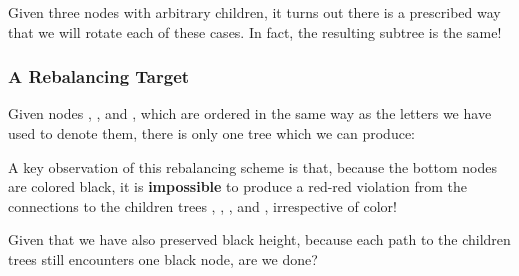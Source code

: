 \documentclass[aspectratio=169, handout]{beamer}
\begin{document}
\begin{frame}
  \pause
  \vspace{\fill}

  Given three nodes with arbitrary children, it turns out there is a
  prescribed way that we will rotate each of these cases. In fact,
  the resulting subtree is the same!
\end{frame}

\begin{frame}
  \frametitle{A Rebalancing Target}

  \begin{center}
    \begin{minipage}{0.58\textwidth}
      \raggedright

      Given nodes , , and , which are ordered in the
      same way as the letters we have used to denote them, there is only one
      tree which we can produce:

      \pause
      \vspace{10pt}

      A key observation of this rebalancing scheme is that, because the
      bottom nodes are colored black, it is \textbf{impossible} to produce a red-red
      violation from the connections to the children trees , ,
      , and , irrespective of color!

      \vspace{10pt}

      Given that we have also preserved black height, because each path to
      the children trees still encounters one black node, are we done?
    \end{minipage}
    \hfill
    \begin{minipage}{0.4\textwidth}
      \centering
    \end{minipage}
  \end{center}
\end{frame}
\end{document}
